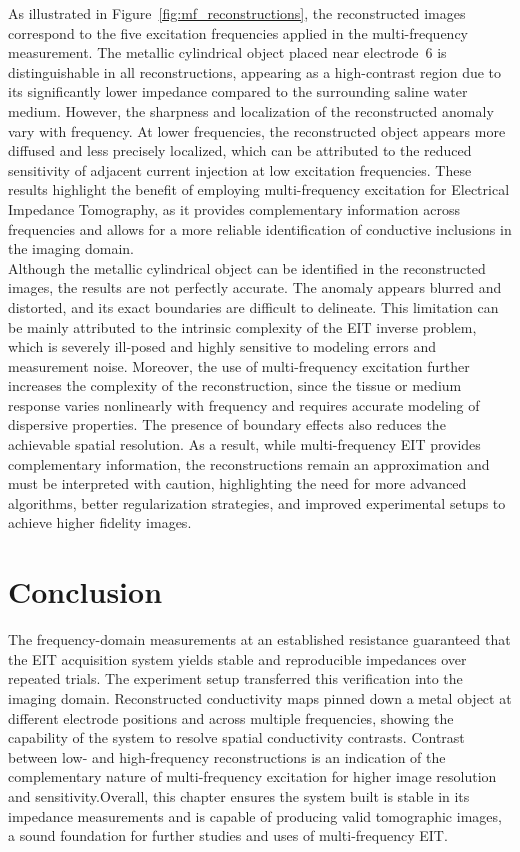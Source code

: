 As illustrated in Figure~\ref{fig:mf_reconstructions}, the reconstructed images correspond to the five excitation frequencies applied in the multi-frequency measurement. 
The metallic cylindrical object placed near electrode~6 is distinguishable in all reconstructions, appearing as a high-contrast region due to its significantly lower impedance compared to the surrounding saline water medium. 
However, the sharpness and localization of the reconstructed anomaly vary with frequency. At lower frequencies, the reconstructed object appears more diffused and less precisely localized, which can be attributed to the reduced sensitivity of adjacent current injection at low excitation frequencies. 
These results highlight the benefit of employing multi-frequency excitation for Electrical Impedance Tomography, as it provides complementary information across frequencies and allows for a more reliable identification of conductive inclusions in the imaging domain.\\
Although the metallic cylindrical object can be identified in the reconstructed images, the results are not perfectly accurate. 
The anomaly appears blurred and distorted, and its exact boundaries are difficult to delineate. 
This limitation can be mainly attributed to the intrinsic complexity of the EIT inverse problem, which is severely ill-posed and highly sensitive to modeling errors and measurement noise. 
Moreover, the use of multi-frequency excitation further increases the complexity of the reconstruction, since the tissue or medium response varies nonlinearly with frequency and requires accurate modeling of dispersive properties. The presence of boundary effects also reduces the achievable spatial resolution. 
As a result, while multi-frequency EIT provides complementary information, the reconstructions remain an approximation and must be interpreted with caution, highlighting the need for more advanced algorithms, better regularization strategies, and improved experimental setups to achieve higher fidelity images.




\section{Conclusion}
The frequency-domain measurements at an established resistance guaranteed that the EIT acquisition system yields stable and reproducible impedances over repeated trials. The experiment setup transferred this verification into the imaging domain. Reconstructed conductivity maps pinned down a metal object at different electrode positions and across multiple frequencies, showing the capability of the system to resolve spatial conductivity contrasts. Contrast between low- and high-frequency reconstructions is an indication of the complementary nature of multi-frequency excitation for higher image resolution and sensitivity.Overall, this chapter ensures the system built is stable in its impedance measurements and is capable of producing valid tomographic images, a sound foundation for further studies and uses of multi-frequency EIT.



